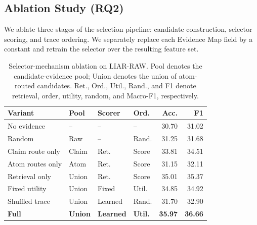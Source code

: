 \documentclass[letterpaper]{article}
\begin{document}
\subsection{Ablation Study (RQ2)}

We ablate three stages of the selection pipeline: candidate
construction, selector scoring, and trace ordering. We separately
replace each Evidence Map field by a constant and retrain the
selector over the resulting feature set.

\begin{table}[t]
\centering
{\small
\setlength{\tabcolsep}{3.5pt}
\begin{tabularx}{\columnwidth}{@{}Y l l l r r@{}}
\toprule
\textbf{Variant}
& \textbf{Pool}
& \textbf{Scorer}
& \textbf{Ord.}
& \textbf{Acc.}
& \textbf{F1} \\
\midrule
No evidence
& -- & -- & --
& 30.70 & 31.02 \\

Random
& Raw & -- & Rand.
& 31.25 & 31.68 \\

Claim route only
& Claim & Ret. & Score
& 33.81 & 34.51 \\

Atom routes only
& Atom & Ret. & Score
& 31.15 & 32.11 \\

Retrieval only
& Union & Ret. & Score
& 35.01 & 35.37 \\

Fixed utility
& Union & Fixed & Util.
& 34.85 & 34.92 \\

Shuffled trace
& Union & Learned & Rand.
& 31.70 & 32.90 \\
\midrule
\textbf{Full}
& \textbf{Union}
& \textbf{Learned}
& \textbf{Util.}
& \textbf{35.97} & \textbf{36.66} \\
\bottomrule
\end{tabularx}
}
\caption{Selector-mechanism ablation on LIAR-RAW.
Pool denotes the candidate-evidence pool; Union denotes the union of
atom-routed candidates. Ret., Ord., Util., Rand., and F1 denote
retrieval, order, utility, random, and Macro-F1, respectively.}
\label{tab:selector-ablation}
\end{table}
\end{document}
